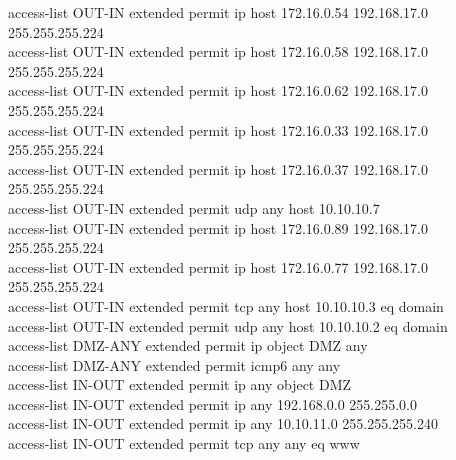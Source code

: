 \documentclass[a4paper, 12pt]{article}
\begin{document}
{\hspace*{1cm}access-list OUT-IN extended permit ip host 172.16.0.54 192.168.17.0 255.255.255.224\\
\hspace*{1cm}access-list OUT-IN extended permit ip host 172.16.0.58 192.168.17.0 255.255.255.224\\
\hspace*{1cm}access-list OUT-IN extended permit ip host 172.16.0.62 192.168.17.0 255.255.255.224\\
\hspace*{1cm}access-list OUT-IN extended permit ip host 172.16.0.33 192.168.17.0 255.255.255.224\\
\hspace*{1cm}access-list OUT-IN extended permit ip host 172.16.0.37 192.168.17.0 255.255.255.224\\
\hspace*{1cm}access-list OUT-IN extended permit udp any host 10.10.10.7\\
\hspace*{1cm}access-list OUT-IN extended permit ip host 172.16.0.89 192.168.17.0 255.255.255.224\\
\hspace*{1cm}access-list OUT-IN extended permit ip host 172.16.0.77 192.168.17.0 255.255.255.224\\
\hspace*{1cm}access-list OUT-IN extended permit tcp any host 10.10.10.3 eq domain\\
\hspace*{1cm}access-list OUT-IN extended permit udp any host 10.10.10.2 eq domain\\
\hspace*{1cm}access-list DMZ-ANY extended permit ip object DMZ any\\
\hspace*{1cm}access-list DMZ-ANY extended permit icmp6 any any\\
\hspace*{1cm}access-list IN-OUT extended permit ip any object DMZ\\
\hspace*{1cm}access-list IN-OUT extended permit ip any 192.168.0.0 255.255.0.0\\
\hspace*{1cm}access-list IN-OUT extended permit ip any 10.10.11.0 255.255.255.240\\
\hspace*{1cm}access-list IN-OUT extended permit tcp any any eq www\\
}
\end{document}
